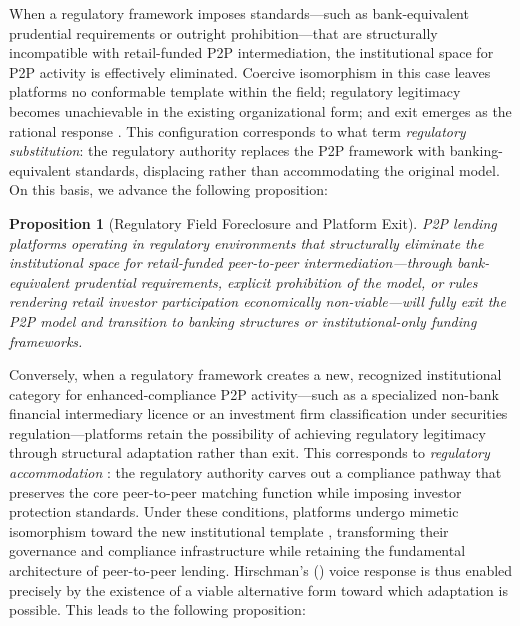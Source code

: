 \documentclass[pdflatex,sn-apa]{sn-jnl}%
\theoremstyle{thmstyleone}%
\newtheorem{proposition}[theorem]{Proposition}%
\theoremstyle{thmstyletwo}%
\theoremstyle{thmstylethree}%
\begin{document}
\textcolor{NavyBlue}{When a regulatory framework imposes standards---such as bank-equivalent prudential requirements or outright prohibition---that are structurally incompatible with retail-funded P2P intermediation, the institutional space for P2P activity is effectively eliminated. Coercive isomorphism \citep{DiMaggio1983} in this case leaves platforms no conformable template within the field; regulatory legitimacy \citep{Suchman1995} becomes unachievable in the existing organizational form; and exit emerges as the rational response \citep{Hirschman1972}. This configuration corresponds to what \citet{Zetzsche2018} term \textit{regulatory substitution}: the regulatory authority replaces the P2P framework with banking-equivalent standards, displacing rather than accommodating the original model. On this basis, we advance the following proposition:}

\begin{proposition}[Regulatory Field Foreclosure and Platform Exit]
\label{prop1}
\textcolor{NavyBlue}{\textit{P2P lending platforms operating in regulatory environments that structurally eliminate the institutional space for retail-funded peer-to-peer intermediation---through bank-equivalent prudential requirements, explicit prohibition of the model, or rules rendering retail investor participation economically non-viable---will fully exit the P2P model and transition to banking structures or institutional-only funding frameworks.}}
\end{proposition}

\textcolor{NavyBlue}{Conversely, when a regulatory framework creates a new, recognized institutional category for enhanced-compliance P2P activity---such as a specialized non-bank financial intermediary licence or an investment firm classification under securities regulation---platforms retain the possibility of achieving regulatory legitimacy through structural adaptation rather than exit. This corresponds to \textit{regulatory accommodation} \citep{Zetzsche2018}: the regulatory authority carves out a compliance pathway that preserves the core peer-to-peer matching function while imposing investor protection standards. Under these conditions, platforms undergo mimetic isomorphism toward the new institutional template \citep{DiMaggio1983}, transforming their governance and compliance infrastructure while retaining the fundamental architecture of peer-to-peer lending. Hirschman's (\citeyear{Hirschman1972}) voice response is thus enabled precisely by the existence of a viable alternative form toward which adaptation is possible. This leads to the following proposition:}
\end{document}
